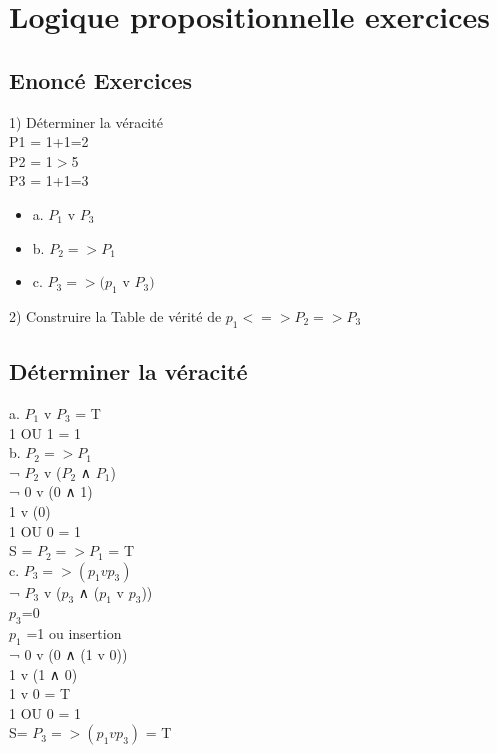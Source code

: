 \newpage

\section{Logique propositionnelle exercices}
\vspace{5mm} %

\subsection{Enoncé Exercices}
\vspace{5mm} %

1) Déterminer la véracité \\

P1 = 1+1=2  \\
P2 = 1$>$5 \\
P3 = 1+1=3 \\

\begin{itemize}
\item {a. $P_1$ v $P_3$}
\item {b. $P_2 => P_1$}
\item {c. $P_3 => (p_1$ v $P_3)$}
\end{itemize}

2) Construire la Table de vérité de $p_1 <=> P_2 => P_3$ \\

\vspace{5mm} %
\subsection{Déterminer la véracité}

a. $P_1$ v $P_3$ = T \\
1 OU 1 = 1\\

b. $P_2 => P_1$ \\
¬ $P_2$ v ($P_2$ ∧ $P_1$) \\
¬ 0 v (0 ∧ 1) \\
1 v (0) \\
1 OU 0 = 1\\
S = $P_2 => P_1$ = T \\

c. $P_3 => (p_1 v p_3)$ \\
¬ $P_3$ v ($p_3$ ∧ ($p_1$ v $p_3$)) \\
$p_3$=0 \\
$p_1$ =1 ou insertion \\
¬ 0 v (0 ∧ (1 v 0)) \\
1 v (1 ∧ 0) \\
1 v 0 = T \\
1 OU 0 = 1 \\
S= $P_3 => (p_1 v p_3)$ = T\\

